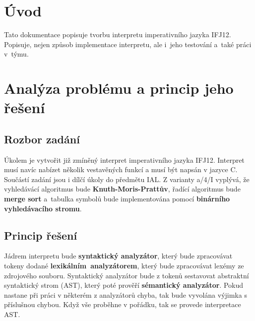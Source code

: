 \documentclass[12pt,a4paper,titlepage,final]{article}
\begin{document}



\pagestyle{plain}
\setcounter{page}{1}
\tableofcontents

\newpage
\pagestyle{plain}
\setcounter{page}{1}

\section{Úvod} \label{uvod}
Tato dokumentace popisuje tvorbu interpretu imperativního jazyka IFJ12. 
Popisuje, nejen způsob implementace interpretu, ale i~jeho testování a~také práci v~týmu.

\section{Analýza problému a princip jeho řešení} \label{analyza}
\subsection{Rozbor zadání}
Úkolem je vytvořit již zmíněný interpret imperativního jazyka IFJ12. Interpret 
musí navíc nabízet několik vestavěných funkcí a musí být napsán v jazyce C. Součástí 
zadání jsou i dílčí úkoly do předmětu IAL. Z varianty a/4/I vyplývá, že vyhledávácí 
algoritmus bude \textbf{Knuth-Moris-Prattův}, řadící algoritmus bude \textbf{merge sort} 
a~tabulka symbolů bude implementována pomocí \textbf{binárního vyhledávacího stromu}. 
\subsection{Princip řešení}
Jádrem interpretu bude \textbf{syntaktický analyzátor}, který bude zpracovávat tokeny 
dodané \mbox{\textbf{lexikálním analyzátorem}}, který bude zpracovávat lexémy ze zdrojového souboru.
Syntaktický analyzátor bude z tokenů sestavovat abstraktní syntaktický strom (AST), který poté
prověří \textbf{sémantický analyzátor}. Pokud nastane při práci v některém z analyzátorů chyba, 
tak bude vyvolána výjimka s příslušnou chybou. Když vše proběhne v pořádku, tak se provede 
interpretace AST. 
                                              
\end{document}
